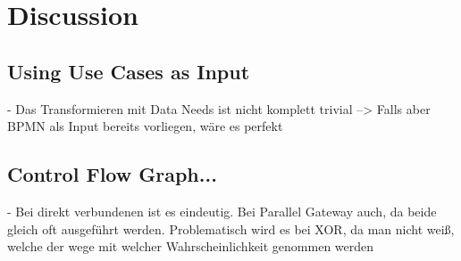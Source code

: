 \chapter{Discussion}
\label{ch:Discussion}

\section{Using Use Cases as Input}
- Das Transformieren mit Data Needs ist nicht komplett trivial --> Falls aber BPMN als Input bereits vorliegen, wäre es perfekt

\section{Control Flow Graph...}
- Bei direkt verbundenen ist es eindeutig. Bei Parallel Gateway auch, da beide gleich oft ausgeführt werden. Problematisch wird es bei XOR, da man nicht weiß, welche der wege mit welcher Wahrscheinlichkeit genommen werden